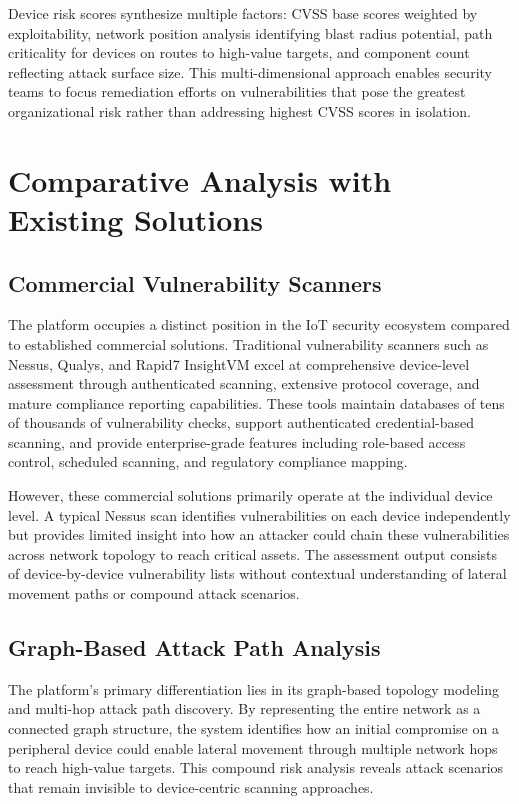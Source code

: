 \documentclass[11pt,a4paper]{article}
\begin{document}
Device risk scores synthesize multiple factors: CVSS base scores weighted by exploitability, network position analysis identifying blast radius potential, path criticality for devices on routes to high-value targets, and component count reflecting attack surface size. This multi-dimensional approach enables security teams to focus remediation efforts on vulnerabilities that pose the greatest organizational risk rather than addressing highest CVSS scores in isolation.
\section{Comparative Analysis with Existing Solutions}

\subsection{Commercial Vulnerability Scanners}

The platform occupies a distinct position in the IoT security ecosystem compared to established commercial solutions. Traditional vulnerability scanners such as Nessus, Qualys, and Rapid7 InsightVM excel at comprehensive device-level assessment through authenticated scanning, extensive protocol coverage, and mature compliance reporting capabilities. These tools maintain databases of tens of thousands of vulnerability checks, support authenticated credential-based scanning, and provide enterprise-grade features including role-based access control, scheduled scanning, and regulatory compliance mapping.

However, these commercial solutions primarily operate at the individual device level. A typical Nessus scan identifies vulnerabilities on each device independently but provides limited insight into how an attacker could chain these vulnerabilities across network topology to reach critical assets. The assessment output consists of device-by-device vulnerability lists without contextual understanding of lateral movement paths or compound attack scenarios.

\subsection{Graph-Based Attack Path Analysis}

The platform's primary differentiation lies in its graph-based topology modeling and multi-hop attack path discovery. By representing the entire network as a connected graph structure, the system identifies how an initial compromise on a peripheral device could enable lateral movement through multiple network hops to reach high-value targets. This compound risk analysis reveals attack scenarios that remain invisible to device-centric scanning approaches.
\end{document}
